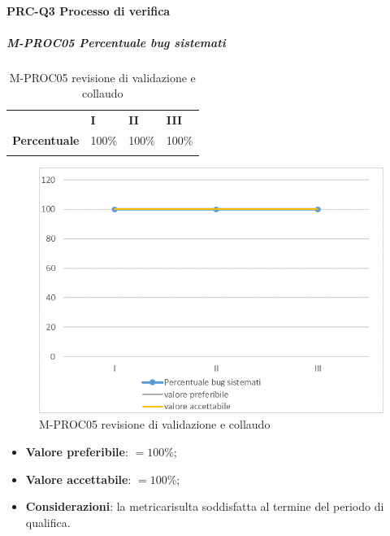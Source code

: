 \paragraph*{PRC-Q3 Processo di verifica}
\subparagraph{M-PROC05 Percentuale bug sistemati} \mbox{}
\begin{longtable}[H!] {						
		>{}p{50mm}  		
		>{}p{8mm}
		>{}p{8mm}		
		>{}p{8mm}		
	}
	\rowcolor{gray!50}
	\textbf{} & \textbf{I} & \textbf{II} & \textbf{III} \TBstrut \\ [2mm]
	\textbf{Percentuale} & 100\% & 100\% & 100\% \TBstrut \\ [2mm]
	\rowcolor{white}
	\caption{M-PROC05 revisione di validazione e collaudo}
\end{longtable}
\begin{figure}[H] 	
	\includegraphics[width=\linewidth]{./img/grafici/RA5.png}	
	\caption{M-PROC05 revisione di validazione e collaudo}	
\end{figure}
\begin{itemize}
	\item \textbf{Valore preferibile}: $=100\%$;
	\item \textbf{Valore accettabile}: $=100\%$;
	\item \textbf{Considerazioni}: la metrica\glosp risulta soddisfatta al termine del periodo di qualifica.
\end{itemize}

